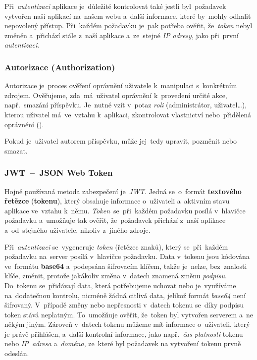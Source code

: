 \documentclass[10pt,a4paper]{article}
\begin{document}
            Při~\emph{autentizaci} aplikace je~důležité kontrolovat také jestli byl~požadavek vytvořen naší aplikací na~našem webu a~další informace, které by~mohly odhalit nepovolený přístup. Při~každém požadavku je~pak potřeba ověřit, že~\emph{token} nebyl změněn a~přichází stále z~naší aplikace a~ze~stejné \emph{IP adresy}, jako při~první \emph{autentizaci}. \cite{graham2021ethical}
            
            \subsubsection{Autorizace (Authorization)}
            Autorizace je~proces ověření oprávnění uživatele k~manipulaci s~konkrétním zdrojem. Ověřujeme, zda~má~uživatel oprávnění k~provedení určité akce, např.~smazání příspěvku. Je~nutné vzít v~potaz \emph{roli} (administrátor, uživatel\dots), kterou uživatel má~ve~vztahu k~aplikaci, zkontrolovat vlastnictví nebo~přidělená oprávnění ().

            Pokud je~uživatel autorem příspěvku, může jej~tedy upravit, pozměnit nebo smazat. \cite{graham2021ethical}

            \subsubsection{JWT~--~JSON Web Token}
            Hojně používaná metoda zabezpečení je~\emph{JWT}. Jedná se~o~formát \textbf{textového řetězce} (\textbf{tokenu}), který obsahuje informace o~uživateli a~aktivním stavu aplikace ve~vztahu k~němu. \emph{Token}~se~při~každém požadavku posílá v~hlavičce požadavku a~umožňuje tak ověřit, že~požadavek přichází z~naší aplikace a~od~stejného uživatele, nikoliv z~jiného zdroje.
            
            Při~\emph{autentizaci} se~vygeneruje \emph{token} (řetězec znaků), který se~při~každém požadavku na~server posílá v~hlavičce požadavku. Data v~tokenu jsou kódována ve~formátu \textbf{base64} a~podepsána šifrovacím klíčem, takže je~nelze, bez~znalosti klíče, změnit, protože jakákoliv změna v~datech znamená změnu \emph{podpisu}. Do~tokenu se~přidávají data, která potřebujeme uchovat nebo je~využíváme na~dodatečnou kontrolu, nicméně žádná citlivá data, jelikož formát \emph{base64} není šifrovaný. V~případě změny nebo nepřesnosti v~datech tokenu se~díky podpisu token stává neplatným. To~umožňuje ověřit, že~token byl vytvořen serverem a~ne někým jiným. Zároveň v~datech tokenu můžeme mít informace o~uživateli, který je právě přihlášen, a~další kontrolní informace, jako např.~\emph{čas platnosti} tokenu nebo \emph{IP~adresa} a~\emph{doména}, ze~které byl požadavek na vytvoření tokenu prvně odeslán.
\end{document}
